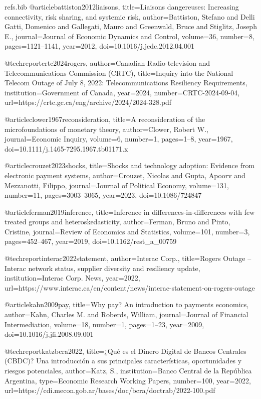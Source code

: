 \begin{filecontents}[overwrite]{refs.bib}
@article{battiston2012liaisons,
  title={Liaisons dangereuses: Increasing connectivity, risk sharing, and systemic risk},
  author={Battiston, Stefano and Delli Gatti, Domenico and Gallegati, Mauro and Greenwald, Bruce and Stiglitz, Joseph E.},
  journal={Journal of Economic Dynamics and Control},
  volume={36},
  number={8},
  pages={1121--1141},
  year={2012},
  doi={10.1016/j.jedc.2012.04.001}
}

@techreport{crtc2024rogers,
  author={{Canadian Radio-television and Telecommunications Commission (CRTC)}},
  title={Inquiry into the National Telecom Outage of July 8, 2022: Telecommunications Resiliency Requirements},
  institution={Government of Canada},
  year={2024},
  number={CRTC-2024-09-04},
  url={https://crtc.gc.ca/eng/archive/2024/2024-328.pdf}
}

@article{clower1967reconsideration,
  title={A reconsideration of the microfoundations of monetary theory},
  author={Clower, Robert W.},
  journal={Economic Inquiry},
  volume={6},
  number={1},
  pages={1--8},
  year={1967},
  doi={10.1111/j.1465-7295.1967.tb01171.x}
}

@article{crouzet2023shocks,
  title={Shocks and technology adoption: Evidence from electronic payment systems},
  author={Crouzet, Nicolas and Gupta, Apoorv and Mezzanotti, Filippo},
  journal={Journal of Political Economy},
  volume={131},
  number={11},
  pages={3003--3065},
  year={2023},
  doi={10.1086/724847}
}

@article{ferman2019inference,
  title={Inference in differences-in-differences with few treated groups and heteroskedasticity},
  author={Ferman, Bruno and Pinto, Cristine},
  journal={Review of Economics and Statistics},
  volume={101},
  number={3},
  pages={452--467},
  year={2019},
  doi={10.1162/rest_a_00759}
}

@techreport{interac2022statement,
  author={{Interac Corp.}},
  title={Rogers Outage -- Interac network status, supplier diversity and resiliency update},
  institution={Interac Corp. News},
  year={2022},
  url={https://www.interac.ca/en/content/news/interac-statement-on-rogers-outage}
}

@article{kahn2009pay,
  title={Why pay? An introduction to payments economics},
  author={Kahn, Charles M. and Roberds, William},
  journal={Journal of Financial Intermediation},
  volume={18},
  number={1},
  pages={1--23},
  year={2009},
  doi={10.1016/j.jfi.2008.09.001}
}

@techreport{katzbcra2022,
  title={¿Qu\'{e} es el Dinero Digital de Bancos Centrales (CBDC)? Una introducci\'{o}n a sus principales caracter\'{i}sticas, oportunidades y riesgos potenciales},
  author={Katz, S.},
  institution={Banco Central de la Rep\'{u}blica Argentina},
  type={Economic Research Working Papers},
  number={100},
  year={2022},
  url={https://cdi.mecon.gob.ar/bases/doc/bcra/doctrab/2022-100.pdf}
}


\end{filecontents}
